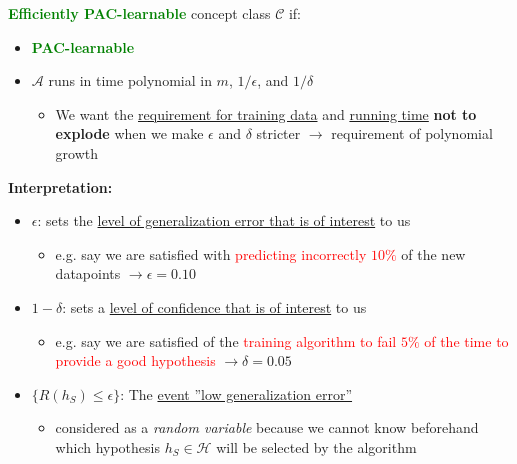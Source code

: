 \documentclass[12pt, a4paper]{article}
\begin{document}
\textbf{\textcolor{Green}{Efficiently PAC-learnable}} concept class $\mathcal{C}$ if:

\begin{itemize}
  \item
     \textbf{\textcolor{Green}{PAC-learnable}}
   \item
      $\mathcal{A}$ runs in time polynomial in $m$, $1/\epsilon$, and $1/\delta$
      \begin{itemize}
        \item We want the \uline{requirement for training data} and \uline{running time} \textbf{not to explode} when we make $\epsilon$ and $\delta$ stricter $\rightarrow$ requirement of polynomial growth
      \end{itemize}
\end{itemize}


\textbf{Interpretation:}
\begin{itemize}
  \item $\epsilon$: sets the \uline{level of generalization error that is of interest} to us
  \begin{itemize}
    \item e.g. say we are satisfied with \textcolor{Red}{predicting incorrectly $10\%$} of the new datapoints $\rightarrow \epsilon = 0.10$
  \end{itemize}
  \item $1-\delta$: sets a \uline{level of confidence that is of interest} to us
  \begin{itemize}
    \item e.g. say we are satisfied of the \textcolor{Red}{training algorithm to fail $5\%$ of the time to provide a good hypothesis} $\rightarrow \delta = 0.05$
  \end{itemize}
  \item $\{R(h_S ) \leq \epsilon\}$: The \uline{event ”low generalization error”}
  \begin{itemize}
    \item considered as a \textit{random variable} because we cannot know beforehand which hypothesis $h_S \in \mathcal{H}$ will be selected by the algorithm
  \end{itemize}
\end{itemize}
\end{document}
